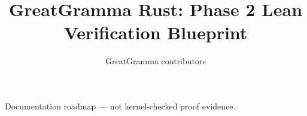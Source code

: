 \documentclass[11pt]{article}
\title{GreatGramma Rust: Phase 2 Lean Verification Blueprint}
\author{GreatGramma contributors}
\date{}
\begin{document}
\maketitle
\begin{center}
  \small Documentation roadmap --- not kernel-checked proof evidence.
\end{center}

\end{document}
